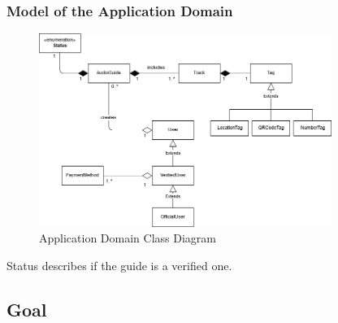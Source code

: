 \documentclass[12pt]{article}
\theoremstyle{definition}
\begin{document}
\pagebreak

\subsubsection{Model of the Application Domain}
\begin{figure}[hbt!]
    \label{fig:domain_cd}
    \centering
    \includegraphics[width=0.85\textwidth]{ClassDiagram/ClassDiagramm_Domain.png}
    \caption{Application Domain Class Diagram}
\end{figure}

Status describes if the guide is a verified one.

\subsection{Goal}
\end{document}
